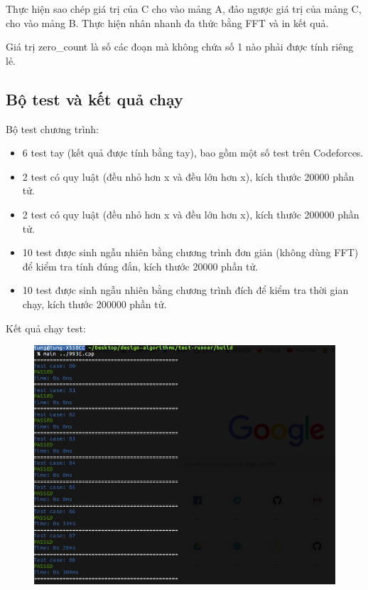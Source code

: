 \documentclass[../report.tex]{subfiles}
\begin{document}
Thực  hiện sao chép giá trị của C cho vào mảng A,
đảo ngược giá trị của mảng C, cho vào 
mảng B. Thực hiện nhân nhanh đa thức bằng FFT và in kết quả. 

Giá trị zero\_count là số các đoạn mà không chứa số 1 nào phải được 
tính riêng lẻ. 

\subsection{Bộ test và kết quả chạy} 
Bộ test chương trình: 
\begin{itemize}
    \item 6 test tay (kết quả được tính bằng tay), bao gồm một 
        số test trên Codeforces. 
    \item 2 test có quy luật (đều nhỏ hơn x và đều lớn hơn x), 
        kích thước 20000 phần tử. 
    \item 2 test có quy luật (đều nhỏ hơn x và đều lớn hơn x), 
        kích thước 200000 phần tử. 
    \item 10 test được sinh ngẫu nhiên bằng chương trình đơn giản 
        (không dùng FFT) để kiểm tra tính đúng đắn, kích thước 
        20000 phần tử. 
    \item 10 test được sinh ngẫu nhiên bằng 
        chương trình đích để kiểm tra thời gian chạy, 
        kích thước 200000 phần tử. 
\end{itemize}
Kết quả chạy test: 
\begin{figure}[H]
\centering
\includegraphics[width=\textwidth]{figures/test-993e-1.png}
\end{figure}
\end{document}
